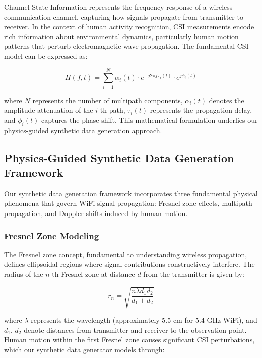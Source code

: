 \documentclass[journal]{IEEEtran}
\begin{document}
Channel State Information represents the frequency response of a wireless communication channel, capturing how signals propagate from transmitter to receiver. In the context of human activity recognition, CSI measurements encode rich information about environmental dynamics, particularly human motion patterns that perturb electromagnetic wave propagation. The fundamental CSI model can be expressed as:

\begin{equation}
H(f,t) = \sum_{i=1}^{N} \alpha_i(t) \cdot e^{-j2\pi f \tau_i(t)} \cdot e^{j\phi_i(t)}
\end{equation}

where $N$ represents the number of multipath components, $\alpha_i(t)$ denotes the amplitude attenuation of the $i$-th path, $\tau_i(t)$ represents the propagation delay, and $\phi_i(t)$ captures the phase shift. This mathematical formulation underlies our physics-guided synthetic data generation approach.

\subsection{Physics-Guided Synthetic Data Generation Framework}

Our synthetic data generation framework incorporates three fundamental physical phenomena that govern WiFi signal propagation: Fresnel zone effects, multipath propagation, and Doppler shifts induced by human motion.

\subsubsection{Fresnel Zone Modeling}

The Fresnel zone concept, fundamental to understanding wireless propagation, defines ellipsoidal regions where signal contributions constructively interfere. The radius of the $n$-th Fresnel zone at distance $d$ from the transmitter is given by:

\begin{equation}
r_n = \sqrt{\frac{n\lambda d_1 d_2}{d_1 + d_2}}
\end{equation}

where $\lambda$ represents the wavelength (approximately 5.5 cm for 5.4 GHz WiFi), and $d_1$, $d_2$ denote distances from transmitter and receiver to the observation point. Human motion within the first Fresnel zone causes significant CSI perturbations, which our synthetic data generator models through:
\end{document}
